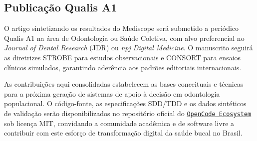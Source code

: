 \subsection{Publicação Qualis A1}

O artigo sintetizando os resultados do Mediscope será submetido a periódico Qualis A1 na área de Odontologia ou Saúde Coletiva, com alvo preferencial no \textit{Journal of Dental Research} (JDR) ou \textit{npj Digital Medicine}. O manuscrito seguirá as diretrizes STROBE para estudos observacionais e CONSORT para ensaios clínicos simulados, garantindo aderência aos padrões editoriais internacionais.

 As contribuições aqui consolidadas estabelecem as bases conceituais e técnicas para a próxima geração de sistemas de apoio à decisão em odontologia populacional. O código-fonte, as especificações SDD/TDD e os dados sintéticos de validação serão disponibilizados no repositório oficial do \href{https://github.com/opencode-ecosystem}{\texttt{OpenCode Ecosystem}} sob licença MIT, convidando a comunidade acadêmica e de software livre a contribuir com este esforço de transformação digital da saúde bucal no Brasil.
